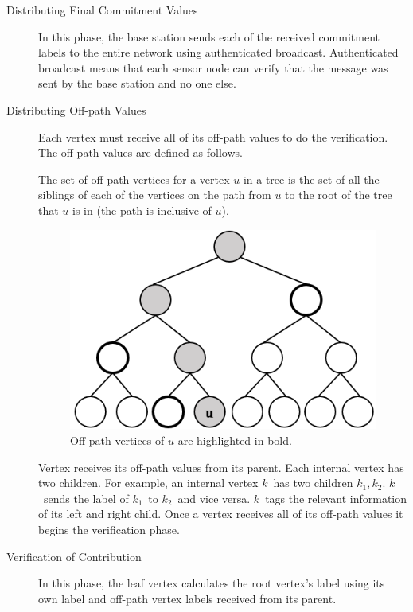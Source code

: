 	\begin{description}
		\item[Distributing Final Commitment Values]
			In this phase, the base station sends each of the received commitment labels to the entire network using authenticated broadcast.
			Authenticated broadcast means that each sensor node can verify that the message was sent by the base station and no one else.
		\item[Distributing Off-path Values]
			Each vertex must receive all of its off-path values to do the verification.
			The off-path values are defined as follows.
			\begin{definition}
				\label{def:off-path}
				\cite{chan2006secure}
				The set of off-path vertices for a vertex $u$ in a tree is the set of all the siblings of each of the vertices on the path from $u$ to the root of the tree that $u$ is in (the path is inclusive of $u$).
			\end{definition}
			\begin{figure}[h!]
				\centering
				\includegraphics[scale = 1]{images/off-path.png}
				\caption{Off-path vertices of $u$ are highlighted in bold.}
				\label{fig:commitment-tree-example-2-shia}
			\end{figure}
			Vertex receives its off-path values from its parent.
			Each internal vertex has two children.
			For example, an internal vertex $k$\ has two children $k_{1},k_{2}$.
			$k$\ sends the label of $k_{1}$\ to $k_{2}$\ and vice versa.
			$k$\ tags the relevant information of its left and right child.
			Once a vertex receives all of its off-path values it begins the verification phase.
		\item[Verification of Contribution]
			In this phase, the leaf vertex calculates the root vertex's label using its own label and off-path vertex labels received from its parent.

\end{description}
